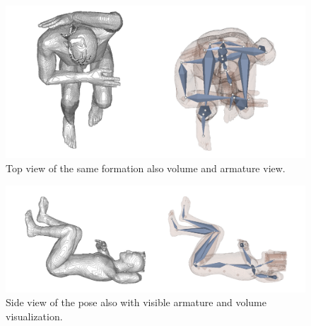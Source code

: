 \begin{figure} [htb!]
    \centering
	\includegraphics[width=13cm]{content/images/results/man3Top.png}
	\caption{Top view of the same formation also volume and armature view.}
	\label{fig:}
\end{figure}

\begin{figure} [htb!]
    \centering
	\includegraphics[width=15cm]{content/images/results/man3Side.png}
	\caption{Side view of the pose also with visible armature and volume visualization.}
	\label{fig:}
\end{figure}

\vspace{3cm}

